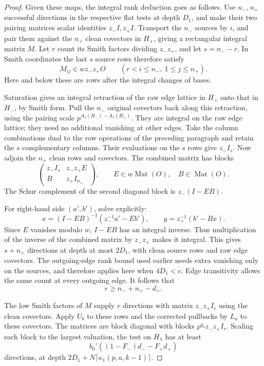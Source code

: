 \begin{proof}
Given these maps, the integral rank deduction goes as follows.
Use \(n_-,n_+\) successful directions in the respective flat
tests at depth \(D_1\), and make their two pairing matrices
scalar identities \(z_- I,z_+ I\). Transport the \(n_-\)
sources by \(i\), and pair them against the \(n_+\) clean
covectors in \(H_+\), giving a rectangular integral matrix
\(M\). Let \(r\) count its Smith factors dividing \(z_-z_+\),
and let \(s=n_--r\). In Smith coordinates the last \(s\) source rows therefore satisfy
\[
  M_{ij}\in w z_-z_+O\qquad(r<i\le n_-,\ 1\le j\le n_+).
\]
Here and below these are rows after the integral changes of bases.

Saturation gives an integral retraction of the raw edge
lattice in \(H_+\) onto that in \(H_-\), by Smith form.
Pull the \(n_-\) original covectors back along this retraction,
using the pairing scale \(p^{A_1(H_-)-A_1(H_+)}\).
They are integral on the raw edge lattice; they need no
additional vanishing at other edges. Take the column
combinations dual to the row operations of the preceding
paragraph and retain the \(s\) complementary columns.
Their evaluations on the \(s\) rows give \(z_- I_s\).
Now adjoin the \(n_+\) clean rows and covectors. The combined
matrix has blocks
\[
 \begin{pmatrix}z_- I_s & z_-z_+ E\\ B & z_+ I_{n_+}\end{pmatrix},
 \qquad E\in w\operatorname{Mat}(O),\quad B\in\operatorname{Mat}(O).
\]
The Schur complement of the second diagonal block is
\(z_- (I-EB)\).

For right-hand side \((a',b')\), solve explicitly:
\[
 x=(I-EB)^{-1}(z_-^{-1}a'-Eb'),\qquad
 y=z_+^{-1}(b'-Bx).
\]
Since \(E\) vanishes modulo \(w\), \(I-EB\) has an integral
inverse. Thus multiplication of the inverse of the combined
matrix by \(z_-z_+\) makes it integral. This gives \(s+n_+\)
directions at depth at most \(2D_1\), with clean source rows
and raw edge covectors. The outgoing-edge
rank bound used earlier needs extra vanishing only on the
sources, and therefore applies here when \(4D_1<c\).
Edge transitivity allows the same count at every outgoing edge.
It follows that
\[
 r\ge n_-+n_+-d_+.
\]


The low Smith factors of \(M\) supply \(r\) directions
with matrix \(z_-z_+ I_r\) using the clean covectors.
Apply \(U_b\) to these rows and the corrected pullbacks by
\(L_a\) to these covectors. The matrices are block diagonal
with blocks \(p^{q_b}z_-z_+ I_r\).
Scaling each block to the largest valuation, the test on
\(H_\lambda\) has at least
\[
 b_0'((1-F_-)d_- - F_+d_+)
\]
directions, at depth
\(2D_1+N\lceil\kappa_1(p,a,k-1)\rceil\).


\end{proof}

